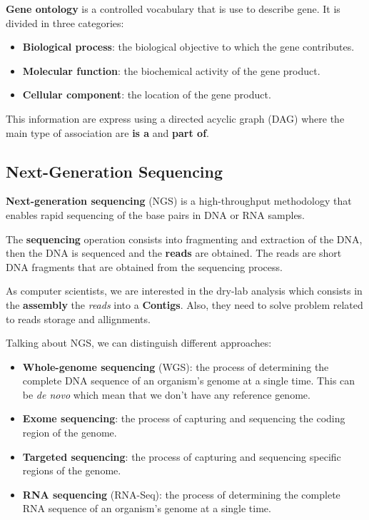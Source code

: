 \textbf{Gene ontology} is a controlled vocabulary that is use to describe gene.
It is divided in three categories:
\begin{itemize}
    \item \textbf{Biological process}: the biological objective to which the gene
          contributes.
    \item \textbf{Molecular function}: the biochemical activity of the gene product.
    \item \textbf{Cellular component}: the location of the gene product.
\end{itemize}
This information are express using a directed acyclic graph (DAG) where the main
type of association are \textbf{is a} and \textbf{part of}.
\subsection{Next-Generation Sequencing}
\textbf{Next-generation sequencing} (NGS) is a high-throughput methodology that
enables rapid sequencing of the base pairs in DNA or RNA samples.

The \textbf{sequencing} operation consists into fragmenting and extraction of
the DNA, then the DNA is sequenced and the \textbf{reads} are obtained. The reads
are short DNA fragments that are obtained from the sequencing process.

As computer scientists, we are interested in the dry-lab analysis which consists
in the \textbf{assembly} the \textit{reads} into a \textbf{Contigs}. Also, they
need to solve problem related to reads storage and allignments.

Talking about NGS, we can distinguish different approaches:
\begin{itemize}
    \item \textbf{Whole-genome sequencing} (WGS): the process of determining the
          complete DNA sequence of an organism's genome at a single time. This
          can be \textit{de novo} which mean that we don't have any reference
          genome.
    \item \textbf{Exome sequencing}: the process of capturing and sequencing the
          coding region of the genome.
    \item \textbf{Targeted sequencing}: the process of capturing and sequencing
          specific regions of the genome.
    \item \textbf{RNA sequencing} (RNA-Seq): the process of determining the
          complete RNA sequence of an organism's genome at a single time.
\end{itemize}


